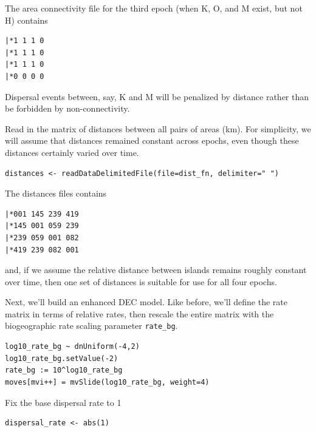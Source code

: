 The area connectivity file for the third epoch (when K, O, and M exist, but not H) contains

\begin{snugshade}
\begin{lstlisting}
|*1 1 1 0
|*1 1 1 0
|*1 1 1 0
|*0 0 0 0
\end{lstlisting}
\end{snugshade}

Dispersal events between, say, K and M will be penalized by distance rather than be forbidden by non-connectivity.


Read in the matrix of distances between all pairs of areas (km).
For simplicity, we will assume that distances remained constant across epochs, even though these distances certainly varied over time.

\begin{snugshade}
\begin{lstlisting}
distances <- readDataDelimitedFile(file=dist_fn, delimiter=" ")
\end{lstlisting}
\end{snugshade}

The distances files contains

\begin{snugshade}
\begin{lstlisting}
|*001 145 239 419
|*145 001 059 239
|*239 059 001 082
|*419 239 082 001
\end{lstlisting}
\end{snugshade}

and, if we assume the relative distance between islands remains roughly constant over time, then one set of distances is suitable for use for all four epochs.


Next, we'll build an enhanced DEC model. Like before, we'll define the rate matrix in terms of relative rates, then rescale the entire matrix with the biogeographic rate scaling parameter {\tt rate\_bg}.

\begin{snugshade}
\begin{lstlisting}
log10_rate_bg ~ dnUniform(-4,2)
log10_rate_bg.setValue(-2)
rate_bg := 10^log10_rate_bg
moves[mvi++] = mvSlide(log10_rate_bg, weight=4)
\end{lstlisting}
\end{snugshade}


Fix the base dispersal rate to 1

\begin{snugshade}
\begin{lstlisting}
dispersal_rate <- abs(1)
\end{lstlisting}
\end{snugshade}

